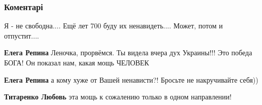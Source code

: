  
 
 
 
 
\subsubsection{Коментарі}

\begin{itemize}
 
Я - не свободна....
Ещё лет 700 буду их ненавидеть....
Может, потом и отпустит....

\begin{itemize}
 
\textbf{Елега Репина} Леночка, прорвёмся. Ты видела вчера дух Украины!!! Это победа БОГА! Он показал нам, какая мощь ЧЕЛОВЕК 🙏

 
\textbf{Елега Репина} а кому хуже от Вашей ненависти?! Бросьте не накручивайте себя))

 
\textbf{Титаренко Любовь} эта мощь к сожалению только в одном направлении!

 

\end{itemize}
\end{itemize}
